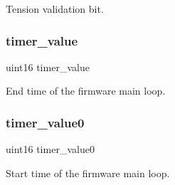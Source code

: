 Tension validation bit. \mbox{\label{globals_8h_a2c95347784600e4a45d481b37eeeef4b}} 
\subsubsection{timer\+\_\+value}
{\footnotesize\ttfamily uint16 timer\+\_\+value}

End time of the firmware main loop. \mbox{\label{globals_8h_a82c5883d1d4a600a1073686f917a812d}} 
\subsubsection{timer\+\_\+value0}
{\footnotesize\ttfamily uint16 timer\+\_\+value0}

Start time of the firmware main loop. 